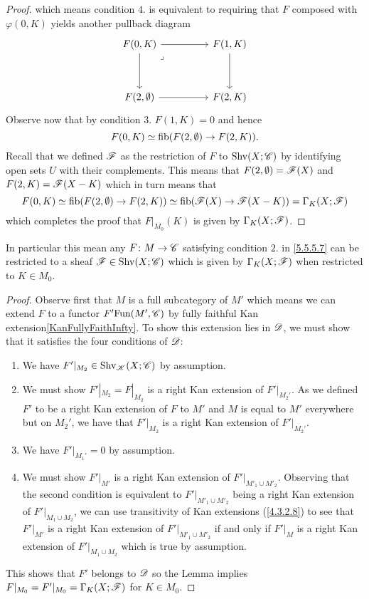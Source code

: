 \documentclass[../../thesis.tex]{subfiles}
\begin{document}
\begin{proof}
    which means condition $4.$ is equivalent to requiring that $F$ composed with $\varphi(0,K)$ yields another pullback diagram
    \[\begin{tikzcd}
            {F(0,K)} && {F(1,K)} \\
            \\
            {F(2,\emptyset)} && {F(2,K)}
            \arrow[from=1-1, to=1-3]
            \arrow[from=1-3, to=3-3]
            \arrow[from=3-1, to=3-3]
            \arrow[from=1-1, to=3-1]
            \arrow["\lrcorner"{anchor=center, pos=0.125}, draw=none, from=1-1, to=3-3]
        \end{tikzcd}\]
    Observe now that by condition $3.$ $F(1,K)=0$ and hence
    \[
        F(0,K)\simeq \operatorname{fib}(F(2,\emptyset) \to F(2,K)).
    \]
    Recall that we defined $\mathscr{F}$ as the restriction of $F$ to $\mathrm{Shv}(X;\mathscr{C})$ by identifying open sets $U$ with their complements.
    This means that $F(2,\emptyset) = \mathscr{F}(X)$ and $F(2,K) = \mathscr{F}(X-K)$ which in turn means that
    \[
        F(0,K)\simeq \operatorname{fib}(F(2,\emptyset) \to F(2,K)) \simeq \operatorname{fib}(\mathscr{F}(X) \to \mathscr{F}(X-K)) = \Gamma_K(X;\mathscr{F})
    \]
    which completes the proof that $F|_{M_0}(K)$ is given by $\Gamma_K(X;\mathscr{F})$.
\end{proof}
\begin{corollary}
    In particular this mean any $F\colon M \to \mathscr{C}$ satisfying condition $2.$ in \ref{5.5.5.7} can be restricted to a sheaf $\mathscr{F}\in\mathrm{Shv}(X;\mathscr{C})$ which is given by $\Gamma_K(X;\mathscr{F})$ when restricted to $K \in M_0$.
\end{corollary}
\begin{proof}
    Observe first that $M$ is a full subcategory of $M'$ which means we can extend $F$ to a functor $F'\mathrm{Fun}(M',\mathscr{C})$ by fully faithful Kan extension\ref{KanFullyFaithInfty}.
    To show this extension lies in $\mathscr{D}$, we must show that it satisfies the four conditions of $\mathscr{D}$:
    \begin{enumerate}
        \item We have $F'|_{M_2} \in \mathrm{Shv}_{\mathscr{K}}(X;\mathscr{C})$ by assumption.
        \item We must show $F'|_{M_2}=F|_{M_2}$ is a right Kan extension of $F'|_{M_2'}$.
              As we defined $F'$ to be a right Kan extension of $F$ to $M'$ and $M$ is equal to $M'$ everywhere but on $M_2'$, we have that $F'|_{M_2}$ is a right Kan extension of $F'|_{M_2'}$.
        \item We have $F'|_{M_1'}=0$ by assumption.
        \item We must show $F'|_{M'}$ is a right Kan extension of $F'|_{M'_1 \cup M'_2}$.
              Observing that the second condition is equivalent to $F'|_{M'_1 \cup M'_2}$ being a right Kan extension of $F'|_{M_1 \cup M_2}$, we can use transitivity of Kan extensions (\ref{4.3.2.8}) to see that $F'|_{M'}$ is a right Kan extension of $F'|_{M'_1 \cup M'_2}$ if and only if $F'|_{M}$ is a right Kan extension of $F'|_{M_1 \cup M_2}$ which is true by assumption.
    \end{enumerate}
    This shows that $F'$ belongs to $\mathscr{D}$ so the Lemma implies $F|_{M_0} = F'|_{M_0} = \Gamma_K(X;\mathscr{F})$ for $K\in M_0$.
\end{proof}
\end{document}
